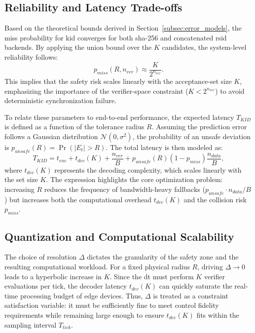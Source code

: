 \subsection[K-ID Reliability and Latency Trade-offs]{ Reliability and Latency Trade-offs}
\label{subsec:reliability_latency_model}

Based on the theoretical bounds derived in Section~\ref{subsec:error_models}, the miss probability for \gls{kid} converges for both \gls{sha}-256 and concatenated \gls{rsid} backends. By applying the union bound over the $K$ candidates, the system-level reliability follows:
\begin{equation}
    p_{miss}(R, n_{ver}) \approx \frac{K}{2^{n_{ver}}}.
    \label{eq:pmiss_kid_law}
\end{equation}
This implies that the safety risk scales linearly with the acceptance-set size $K$, emphasizing the importance of the verifier-space constraint ($K < 2^{n_{ver}}$) to avoid deterministic synchronization failure.

To relate these parameters to end-to-end performance, the expected latency $T_{KID}$ is defined as a function of the tolerance radius $R$. Assuming the prediction error follows a Gaussian distribution $\mathcal{N}(0, \sigma^2)$, the probability of an unsafe deviation is $p_{unsafe}(R) = \Pr(|E_t| > R)$. The total latency is then modeled as:
\begin{equation}
    T_{KID} = t_{enc} + t_{dec}(K) + \frac{n_{ver}}{B} + p_{unsafe}(R)(1 - p_{miss})\frac{n_{data}}{B},
    \label{eq:kid_latency_final}
\end{equation}
where $t_{dec}(K)$ represents the decoding complexity, which scales linearly with the set size $K$. The expression highlights the core optimization problem: increasing $R$ reduces the frequency of bandwidth-heavy fallbacks ($p_{unsafe} \cdot n_{data}/B$) but increases both the computational overhead $t_{dec}(K)$ and the collision risk $p_{miss}$.



\subsection{Quantization and Computational Scalability}

The choice of resolution $\Delta$ dictates the granularity of the safety zone and the resulting computational workload. For a fixed physical radius $R$, driving $\Delta \to 0$ leads to a hyperbolic increase in $K$. Since the \gls{dt} must perform $K$ verifier evaluations per tick, the decoder latency $t_{dec}(K)$ can quickly saturate the real-time processing budget of edge devices. Thus, $\Delta$ is treated as a constraint satisfaction variable: it must be sufficiently fine to meet control fidelity requirements while remaining large enough to ensure $t_{dec}(K)$ fits within the sampling interval $T_{tick}$.


